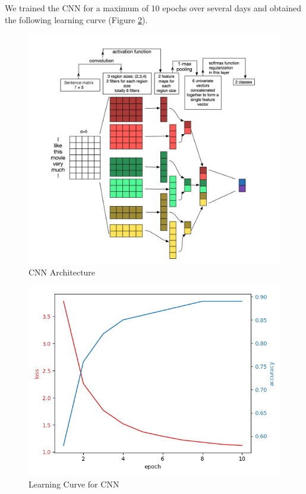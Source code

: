 \documentclass{sig-alternate-05-2015}
\begin{document}
We trained the CNN for a maximum of 10 epochs over several days and obtained the following learning curve (Figure \ref{fig:learningCurveCNN}).

\begin{figure}[H]
\centering
\includegraphics[width=\linewidth]{plots/multi-channel-CNN-architecture.png}
\caption{CNN Architecture}
\label{fig:architectureCNN}
\end{figure}

\begin{figure}[H]
\centering
\includegraphics[width=\linewidth]{plots/learning_curve_cnn.png}
\caption{Learning Curve for CNN}
\label{fig:learningCurveCNN}
\end{figure}
\end{document}
